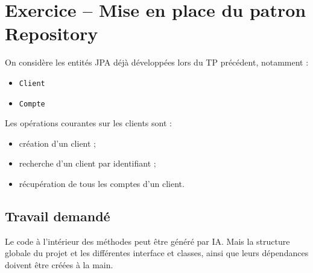 \documentclass[11pt]{article}
\begin{document}
\bigskip

\section*{Exercice -- Mise en place du patron Repository}

On considère les entités JPA déjà développées lors du TP précédent, notamment :
\begin{itemize}
    \item \texttt{Client}
    \item \texttt{Compte}
\end{itemize}

Les opérations courantes sur les clients sont :
\begin{itemize}
    \item création d’un client ;
    \item recherche d’un client par identifiant ;
    \item récupération de tous les comptes d’un client.
\end{itemize}

\subsection*{Travail demandé}

Le code à l'intérieur des méthodes peut être généré par IA. Mais la structure globale du projet et les différentes interface et classes, ainsi que leurs dépendances doivent être créées à la main.
\end{document}
